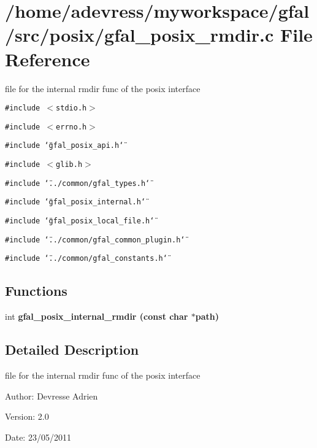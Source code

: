 \section{/home/adevress/myworkspace/gfal/src/posix/gfal\_\-posix\_\-rmdir.c File Reference}
\label{gfal__posix__rmdir_8c}
file for the internal rmdir func of the posix interface 

{\tt \#include $<$stdio.h$>$}\par
{\tt \#include $<$errno.h$>$}\par
{\tt \#include \char`\"{}gfal\_\-posix\_\-api.h\char`\"{}}\par
{\tt \#include $<$glib.h$>$}\par
{\tt \#include \char`\"{}../common/gfal\_\-types.h\char`\"{}}\par
{\tt \#include \char`\"{}gfal\_\-posix\_\-internal.h\char`\"{}}\par
{\tt \#include \char`\"{}gfal\_\-posix\_\-local\_\-file.h\char`\"{}}\par
{\tt \#include \char`\"{}../common/gfal\_\-common\_\-plugin.h\char`\"{}}\par
{\tt \#include \char`\"{}../common/gfal\_\-constants.h\char`\"{}}\par
\subsection*{Functions}
\begin{CompactItemize}
\item 
int \bf{gfal\_\-posix\_\-internal\_\-rmdir} (const char $\ast$path)
\end{CompactItemize}


\subsection{Detailed Description}
file for the internal rmdir func of the posix interface 

\begin{Desc}
\item[Author:]Devresse Adrien \end{Desc}
\begin{Desc}
\item[Version:]2.0 \end{Desc}
\begin{Desc}
\item[Date:]23/05/2011 \end{Desc}


